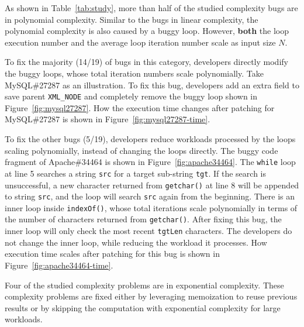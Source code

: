As shown in Table~\ref{tab:study}, 
more than half of the studied complexity bugs are in polynomial complexity. 
Similar to the bugs in linear complexity,
the polynomial complexity is also caused by a buggy loop.
However, {\bf both} the loop execution number 
and the average loop iteration number
scale as input size $N$.





To fix the majority (14/19) of bugs in this category,
developers directly modify the buggy loops, 
whose total iteration numbers scale polynomially.
Take MySQL\#27287 as an illustration.
To fix this bug,
developers add an extra field to save parent \texttt{XML\_NODE}
and completely remove the buggy loop shown in Figure~\ref{fig:mysql27287}.
How the execution time changes after patching for MySQL\#27287 is 
shown in Figure~\ref{fig:mysql27287-time}. 

To fix the other bugs (5/19),
developers reduce workloads processed by the loops scaling polynomially, 
instead of changing the loops directly.
The buggy code fragment of Apache\#34464 is shown in Figure~\ref{fig:apache34464}.
The \texttt{while} loop at line 5 searches a string \texttt{src}
for a target sub-string \texttt{tgt}.
If the search is unsuccessful, 
a new character returned from \texttt{getchar()} at line 8 will be appended 
to string \texttt{src}, 
and the loop will search \texttt{src} again from the beginning. 
There is an inner loop inside \texttt{indexOf()}, whose total iterations 
scale polynomially in terms of the number of characters returned from \texttt{getchar()}. 
After fixing this bug, the inner loop will only check the most recent \texttt{tgtLen} characters.
The developers do not change the inner loop, 
while reducing the workload it processes.   
How execution time scales after patching for 
this bug is shown in Figure~\ref{fig:apache34464-time}.




Four of the studied complexity problems are in exponential complexity. 
These complexity problems are fixed 
either by leveraging memoization to reuse previous results 
or by skipping the computation with exponential complexity for large workloads. 



